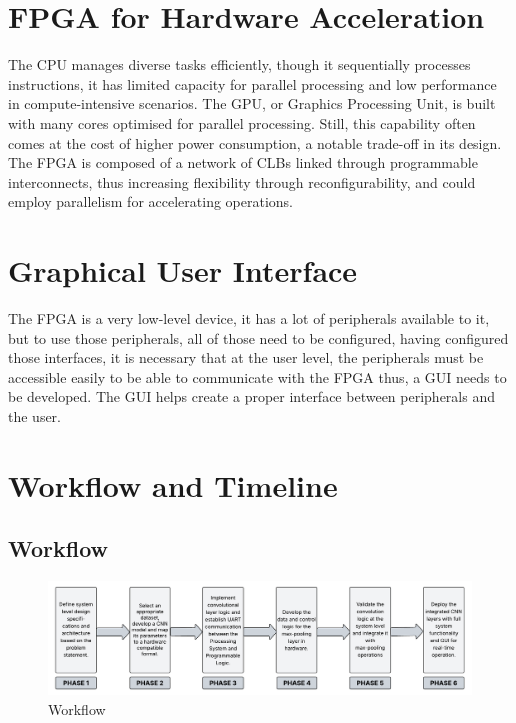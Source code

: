     \section{FPGA for Hardware Acceleration}
    \noindent
    The CPU manages diverse tasks efficiently, though it sequentially processes instructions, it has limited capacity for parallel processing and low performance in compute-intensive scenarios. The GPU, or Graphics Processing Unit, is built with many cores optimised for parallel processing. Still, this capability often comes at the cost of higher power consumption, a notable trade-off in its design. The FPGA is composed of a network of CLBs linked through programmable interconnects, thus increasing flexibility through reconfigurability, and could employ parallelism for accelerating operations.

    
    
    \section{Graphical User Interface}
    \noindent
    The FPGA is a very low-level device, it has a lot of peripherals available to it, but to use those peripherals, all of those need to be configured, having configured those interfaces, it is necessary that at the user level, the peripherals must be accessible easily to be able to communicate with the FPGA thus, a GUI needs to be developed. The GUI helps create a proper interface between peripherals and the user.

    \section{Workflow and Timeline}
    
    \subsection{Workflow}
    \begin{figure}[H]
        \centering
        \includegraphics[width=1.1\linewidth]{images/workflow.png}
        \caption{Workflow}
        \label{fig:workflow}
    \end{figure}

